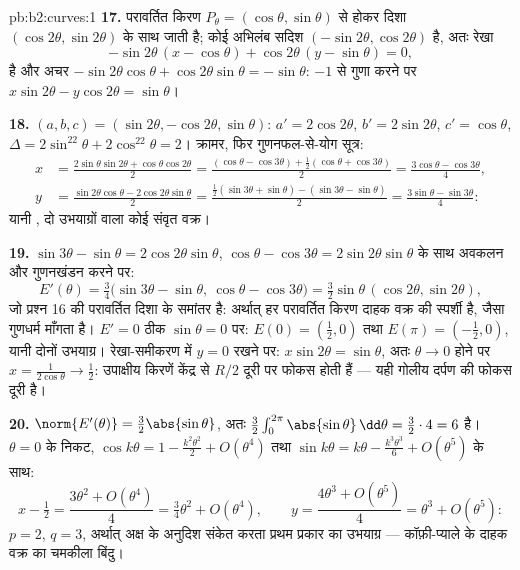 \begin{solution}{pb:b2:curves:1}
\textbf{17.} परावर्तित किरण $P_\theta =
(\cos\theta, \sin\theta)$ से होकर दिशा $(\cos2\theta,
\sin2\theta)$ के साथ जाती है; कोई अभिलंब सदिश $(-\sin2\theta,
\cos2\theta)$ है, अतः रेखा
\[
-\sin2\theta\,(x - \cos\theta) + \cos2\theta\,(y -
\sin\theta) = 0,
\]
है और अचर $-\sin2\theta\cos\theta +
\cos2\theta\sin\theta = -\sin\theta$: $-1$ से गुणा करने पर
$x\sin2\theta - y\cos2\theta = \sin\theta$।

\textbf{18.} $(a, b, c) = (\sin2\theta, -\cos2\theta,
\sin\theta)$: $a' = 2\cos2\theta$, $b' = 2\sin2\theta$, $c' =
\cos\theta$, $\Delta = 2\sin^22\theta + 2\cos^22\theta = 2$।
क्रामर, फिर गुणनफल-से-योग सूत्र:
\begin{align*}
x &= \frac{2\sin\theta\sin2\theta +
\cos\theta\cos2\theta}{2}
= \frac{(\cos\theta - \cos3\theta) + \frac12(\cos\theta +
\cos3\theta)}{2} = \frac{3\cos\theta - \cos3\theta}4,\\
y &= \frac{\sin2\theta\cos\theta - 2\cos2\theta\sin\theta}2
= \frac{\frac12(\sin3\theta + \sin\theta) - (\sin3\theta -
\sin\theta)}2 = \frac{3\sin\theta - \sin3\theta}4 :
\end{align*}
यानी , दो उभयाग्रों वाला कोई संवृत वक्र।

\textbf{19.} $\sin3\theta
- \sin\theta = 2\cos2\theta\sin\theta$, $\cos\theta -
\cos3\theta = 2\sin2\theta\sin\theta$ के साथ अवकलन और गुणनखंडन करने पर:
\[
E'(\theta) = \tfrac34\bigl(\sin3\theta - \sin\theta,\
\cos\theta - \cos3\theta\bigr)
= \tfrac32\sin\theta\,(\cos2\theta, \sin2\theta),
\]
जो प्रश्न 16 की परावर्तित दिशा के समांतर है: अर्थात् हर परावर्तित
किरण दाहक वक्र की स्पर्शी है, जैसा  गुणधर्म माँगता है।
$E' = 0$ ठीक $\sin\theta = 0$ पर: $E(0) = (\tfrac12, 0)$ तथा $E(\pi) = (-\tfrac12, 0)$, यानी दोनों
उभयाग्र। रेखा-समीकरण में $y = 0$ रखने पर: $x\sin2\theta =
\sin\theta$, अतः $\theta \to 0$ होने
पर $x = \frac1{2\cos\theta} \to \frac12$: उपाक्षीय किरणें केंद्र से $R/2$ दूरी पर फोकस होती हैं
--- यही गोलीय दर्पण की फोकस दूरी है।

\textbf{20.} $\norm{E'(\theta)} = \tfrac32\abs{\sin\theta}$,
अतः  $\tfrac32\int_0^{2\pi}\abs{\sin\theta}\,
\dd\theta = \tfrac32\cdot4 = 6$ है। $\theta = 0$ के निकट,
$\cos k\theta = 1 - \tfrac{k^2\theta^2}2 + O(\theta^4)$ तथा
$\sin k\theta = k\theta - \tfrac{k^3\theta^3}6 +
O(\theta^5)$ के साथ:
\[
x - \tfrac12 = \frac{3\theta^2 + O(\theta^4)}{4}
= \tfrac34\theta^2 + O(\theta^4),
\qquad
y = \frac{4\theta^3 + O(\theta^5)}{4}
= \theta^3 + O(\theta^5) :
\]
$p = 2$, $q = 3$, अर्थात् अक्ष के अनुदिश संकेत करता प्रथम प्रकार का
उभयाग्र --- कॉफ़ी-प्याले के दाहक वक्र का चमकीला बिंदु।


\end{solution}
